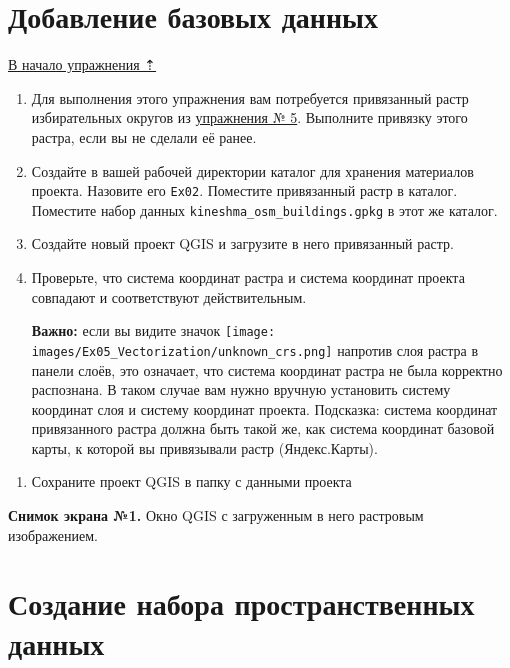 \documentclass[
  12pt,
]{book}
\providecommand{\tightlist}{%
  \setlength{\itemsep}{0pt}\setlength{\parskip}{0pt}}
\begin{document}
\hypertarget{digitizing-basedata}{%
\section{Добавление базовых данных}\label{digitizing-basedata}}

\protect\hyperlink{digitizingf-districts}{В начало упражнения ⇡}

\begin{enumerate}
\def\labelenumi{\arabic{enumi}.}
\item
  Для выполнения этого упражнения вам потребуется привязанный растр избирательных округов из \protect\hyperlink{raster-reference-linear}{упражнения № 5}. Выполните привязку этого растра, если вы не сделали её ранее.
\item
  Создайте в вашей рабочей директории каталог для хранения материалов проекта. Назовите его \texttt{Ex02}. Поместите привязанный растр в каталог. Поместите набор данных \texttt{kineshma\_osm\_buildings.gpkg} в этот же каталог.
\item
  Создайте новый проект QGIS и загрузите в него привязанный растр.
\item
  Проверьте, что система координат растра и система координат проекта совпадают и соответствуют действительным.

  \textbf{Важно:} если вы видите значок \texttt{[image: images/Ex05\_Vectorization/unknown\_crs.png]} напротив слоя растра в панели слоёв, это означает, что система координат растра не была корректно распознана. В таком случае вам нужно вручную установить систему координат слоя и систему координат проекта. Подсказка: система координат привязанного растра должна быть такой же, как система координат базовой карты, к которой вы привязывали растр (Яндекс.Карты).
\end{enumerate}

\begin{enumerate}
\def\labelenumi{\arabic{enumi}.}
\setcounter{enumi}{4}
\tightlist
\item
  Сохраните проект QGIS в папку с данными проекта
\end{enumerate}

\textbf{Снимок экрана №1.} Окно QGIS с загруженным в него растровым изображением.

\hypertarget{digitizing-new-geopackage}{%
\section{Создание набора пространственных данных}\label{digitizing-new-geopackage}}
\end{document}
